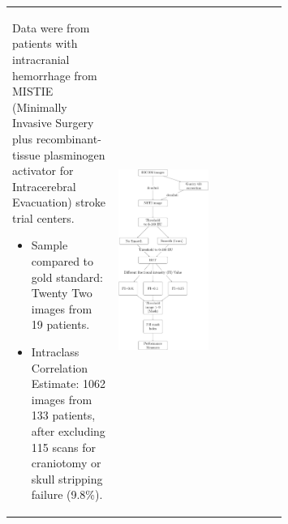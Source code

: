 \documentclass[final]{beamer}\usepackage[]{graphicx}\usepackage[]{color}
\begin{document}
\begin{frame}[fragile]
\begin{multicols}{2}
\begin{figure}
\centering
\begin{tabular}{m{0.3\linewidth}>{\centering}m{0.3\linewidth}p{0.2\linewidth}}
Data were from patients with intracranial hemorrhage from MISTIE (Minimally Invasive Surgery plus recombinant-tissue plasminogen activator for Intracerebral Evacuation) stroke trial centers.
\begin{itemize}
\item Sample compared to gold standard: Twenty Two images from 19 patients. 
\item Intraclass Correlation Estimate: 1062 images from 133 patients, after excluding 115 scans for craniotomy or skull stripping failure (9.8\%).  
\end{itemize} &
\includegraphics[scale=0.7]{Imaging_Pipeline_Flowchart.pdf} & 

\end{tabular}
\end{figure}
\end{multicols}
\end{frame}
\end{document}
